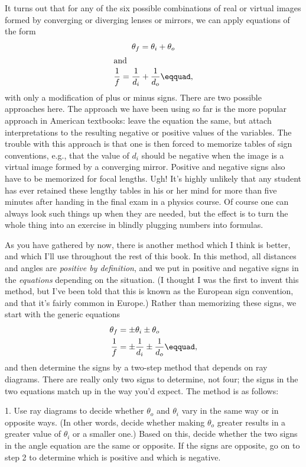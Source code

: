 It turns out that for any of the six possible combinations
of real or virtual images formed by converging or diverging
lenses or mirrors, we can apply equations of the form
\begin{gather*}
                \theta_f =  \theta_i+\theta_o \\
\intertext{and}
        \frac{1}{f}            =  \frac{1}{d_i}+\frac{1}{d_o}\eqquad,
\end{gather*}
with only a modification of plus or minus signs. There are
two possible approaches here. The approach we have been
using so far is the more popular approach in American
textbooks: leave the equation the same, but attach
interpretations to the resulting negative or positive values
of the variables. The trouble with this approach is that one
is then forced to memorize tables of sign conventions, e.g.,
that the value of $d_i$ should be negative when the image is
a virtual image formed by a converging mirror. Positive and
negative signs also have to be memorized for focal lengths.
Ugh! It's highly unlikely that any student has ever retained
these lengthy tables in his or her mind for more than five
minutes after handing in the final exam in a physics course.
Of course one can always look such things up when they are
needed, but the effect is to turn the whole thing into an
exercise in blindly plugging numbers into formulas.

As you have gathered by now, there is another method which I
think is better, and which I'll use throughout the rest of
this book. In this method, all distances and angles are
\emph{positive by definition}, and we put in positive and
negative signs in the \emph{equations} depending on the
situation. (I thought I was the first to invent this method,
but I've been told that this is known as the European sign
convention, and that it's fairly common in Europe.) Rather
than memorizing these signs, we start with the generic equations
\begin{align*}
                \theta_f &= \pm \theta_i \pm \theta_o \\
        \frac{1}{f}            &=  \pm\frac{1}{d_i}\pm\frac{1}{d_o}\eqquad,
\end{align*}
and then determine the signs by a two-step method that
depends on ray diagrams. There are really only two signs to
determine, not four; the signs in the two equations match up
in the way you'd expect. The method is as follows:

1. Use ray diagrams to decide whether $\theta_o$ and
$\theta_i$ vary in the same way or in opposite ways. (In
other words, decide whether making $\theta_o$ greater
results in a greater value of $\theta_i$ or a smaller one.)
Based on this, decide whether the two signs in the angle
equation are the same or opposite. If the signs are
opposite, go on to step 2 to determine which is positive
and which is negative.

